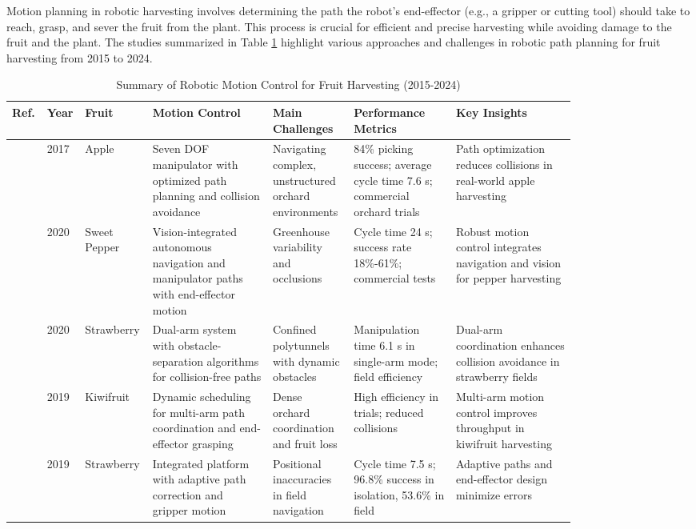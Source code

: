 \documentclass[a4paper,fleqn]{cas-dc}
\begin{document}
Motion planning in robotic harvesting involves determining the path the robot's end-effector (e.g., a gripper or cutting tool) should take to reach, grasp, and sever the fruit from the plant. This process is crucial for efficient and precise harvesting while avoiding damage to the fruit and the plant. The studies summarized in Table \ref{tab:motion-control-based} highlight various approaches and challenges in robotic path planning for fruit harvesting from 2015 to 2024.

\begin{table}[htbp]
\centering
\small
\caption{Summary of Robotic Motion Control for Fruit Harvesting (2015-2024)}
\label{tab:motion-control-based}
\begin{tabular}{p{0.025\linewidth} p{0.025\linewidth} p{0.055\linewidth} p{0.2\linewidth} p{0.135\linewidth} p{0.175\linewidth} p{0.2\linewidth}}
\toprule
\textbf{Ref.} & \textbf{Year} & \textbf{Fruit} & \textbf{Motion Control} & \textbf{Main Challenges} & \textbf{Performance Metrics} & \textbf{Key Insights} \\ \midrule
\cite{silwal2017design} & 2017 & Apple & Seven DOF manipulator with optimized path planning and collision avoidance & Navigating complex, unstructured orchard environments & 84\% picking success; average cycle time 7.6 s; commercial orchard trials & Path optimization reduces collisions in real-world apple harvesting \\ \midrule
\cite{arad2020development} & 2020 & Sweet Pepper & Vision-integrated autonomous navigation and manipulator paths with end-effector motion & Greenhouse variability and occlusions & Cycle time 24 s; success rate 18\%-61\%; commercial tests & Robust motion control integrates navigation and vision for pepper harvesting \\ \midrule
\cite{xiong2020autonomous} & 2020 & Strawberry & Dual-arm system with obstacle-separation algorithms for collision-free paths & Confined polytunnels with dynamic obstacles & Manipulation time 6.1 s in single-arm mode; field efficiency & Dual-arm coordination enhances collision avoidance in strawberry fields \\ \midrule
\cite{williams2019robotic} & 2019 & Kiwifruit & Dynamic scheduling for multi-arm path coordination and end-effector grasping & Dense orchard coordination and fruit loss & High efficiency in trials; reduced collisions & Multi-arm motion control improves throughput in kiwifruit harvesting \\ \midrule
\cite{xiong2019development} & 2019 & Strawberry & Integrated platform with adaptive path correction and gripper motion & Positional inaccuracies in field navigation & Cycle time 7.5 s; 96.8\% success in isolation, 53.6\% in field & Adaptive paths and end-effector design minimize errors \\ \midrule

\end{tabular}
\end{table}
\end{document}
